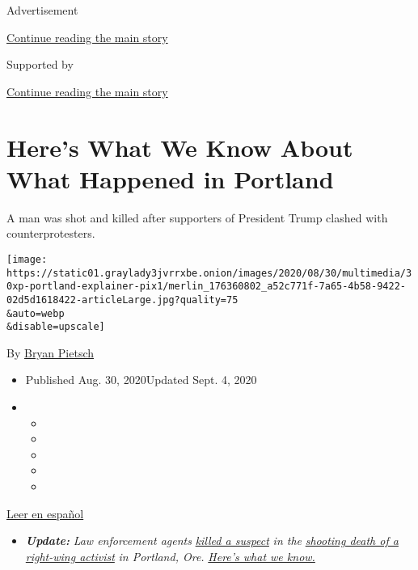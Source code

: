 Advertisement

\protect\hyperlink{after-top}{Continue reading the main story}

Supported by

\protect\hyperlink{after-sponsor}{Continue reading the main story}

\hypertarget{heres-what-we-know-about-what-happened-in-portland}{%
\section{Here's What We Know About What Happened in
Portland}\label{heres-what-we-know-about-what-happened-in-portland}}

A man was shot and killed after supporters of President Trump clashed
with counterprotesters.

\texttt{[image: https://static01.graylady3jvrrxbe.onion/images/2020/08/30/multimedia/30xp-portland-explainer-pix1/merlin\_176360802\_a52c771f-7a65-4b58-9422-02d5d1618422-articleLarge.jpg?quality=75\\\&auto=webp\\\&disable=upscale]}

By \href{https://www.nytimes3xbfgragh.onion/by/bryan-pietsch}{Bryan
Pietsch}

\begin{itemize}
\item
  Published Aug. 30, 2020Updated Sept. 4, 2020
\item
  \begin{itemize}
  \item
  \item
  \item
  \item
  \item
  \end{itemize}
\end{itemize}

\href{https://www.nytimes3xbfgragh.onion/es/2020/09/01/espanol/estados-unidos/protestas-portland-tiroteo.html}{Leer
en español}

\begin{itemize}
\tightlist
\item
  \emph{\textbf{Update:}} \emph{Law enforcement agents}
  \href{https://www.nytimes3xbfgragh.onion/2020/09/03/us/michael-reinoehl-arrest-portland-shooting.html?action=click\&module=Top\%20Stories\&pgtype=Homepage}{\emph{killed
  a suspect}} \emph{in the}
  \href{https://www.nytimes3xbfgragh.onion/2020/08/30/us/portland-trump-rally-shooting.html}{\emph{shooting
  death of a right-wing activist}} \emph{in Portland, Ore.}
  \href{https://www.nytimes3xbfgragh.onion/2020/09/04/us/michael-forest-reinoehl-portland.html}{\emph{Here's
  what we know.}}
\end{itemize}

